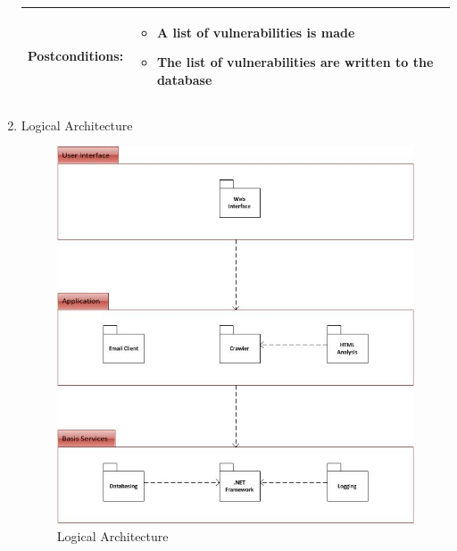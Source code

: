 \documentclass{article}
\begin{document}
\begin{enumerate}
\begin{tabular}{|p{} | p{}|}
Postconditions:	&
\begin{itemize}
	\item A list of vulnerabilities is made
	\item The list of vulnerabilities are written to the database
\end{itemize} \\ \hline
\end{tabular}

\newpage
\item Logical Architecture\\
\begin{figure}[H]
	\includegraphics[width=\textwidth]{LogArch}
	\caption{Logical Architecture}
\end{figure}


\end{enumerate}
\end{document}

